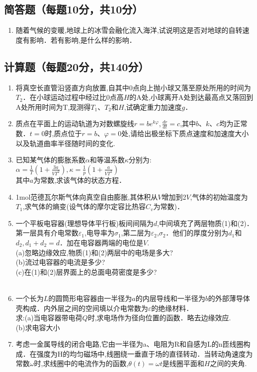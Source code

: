 
\subsection{简答题（每题10分，共10分）}
\begin{enumerate}
\item 随着气候的变暖,地球上的冰雪会融化流入海洋,试说明这是否对地球的自转速度有影响．若有影响,是什么样的影响．
\end{enumerate}
\subsection{计算题（每题20分，共140分）}
\begin{enumerate}
\item 将真空长直管沿竖直方向放置,自其中0点向上抛小球又落至原处所用的时间为$T_2$．在小球运动过程中经过比0点高$H$的$\mathrm A$处,小球离开$\mathrm A$处到达最高点又落回到$\mathrm A$处所用时间为T,现测得$T_1$、$T_2$和$H$,试确定重力加速度$g$．
\item 质点在平面上的运动轨道为对数螺旋线$r=be^{k\varphi},\frac{dr}{dt}=c$,其中$b$、$k$、$c$均为正常数．$t=0$时,质点位于$r=b$、$\varphi=0$处,请给出极坐标下质点速度和加速度大小以及轨道曲率半径随时间的变化.
\item 已知某气体的膨胀系数$\alpha$和等温系数$\kappa$分别为:\\
$\alpha=\frac{1}{T}(1+\frac{3a}{VT^2}),\kappa=\frac{1}{p}(1+\frac{a}{VT^2})$\\
其中$a$为常数,求该气体的状态方程．

\item 1mol范德瓦尔斯气体向真空自由膨胀,其体积从$V$增加到2$V$,气体的初始温度为$T_1$,求气体的熵变(设气体的摩尔定容比热容$C_v$为常数)．
\item 一个平板电容器(理想导体平行板)板间间隔为$d$,中间填充了两层物质(1)和(2)．第一层具有介电常数$\varepsilon_1$,电导率为$\sigma_1$,第二层为$\varepsilon_2$,$\sigma_2$．他们的厚度分别为$d_1$和$d_2,d_1+d_2=d$．加在电容器两端的电位是$V$.\\
(a)忽略边缘效应,物质(1)和(2)两层中的电场是多大?\\
(b)流过电容器的电流是多少?\\
(c)在(1)和(2)层界面上的总面电荷密度是多少?\\
\\
\item 一个长为$L$的圆筒形电容器由一半径为$a$的内层导线和一半径为$b$的外部薄导体壳构成．内外层之间的空间填以介电常数为$\varepsilon$的绝缘材料．\\
求:(a)当电容器带电荷$Q$时,求电场作为径向位置的函数．略去边缘效应.\\
(b)求电容大小
\item 考虑一金属导线的闭合电路,它由一半径为a、电阻为R和自感为L的n匝线圈构成．在强度为H的均匀磁场中,线圈绕一垂直于场的直径转动．当转动角速度为常数$\omega$时,求线圈中的电流作为的函数,$\theta (t)=\omega t$是线圈平面和$H$之间的夹角.

\end{enumerate}